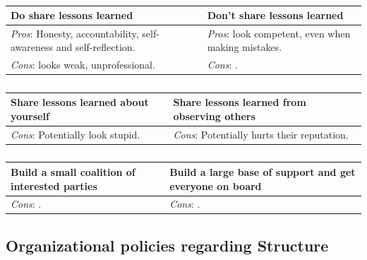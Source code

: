 \begin{center}
\begin{table}[ht]
\begin{tabular}{ | m{\dilemmatablewidth}| m{\dilemmatablewidth} | } 
  \hline
  \textbf{Do share lessons learned} & 
  \textbf{Don't share lessons learned} \\ 
  \hline
  \textit{Pros}: Honesty, accountability, self-awareness and self-reflection. & 
  \textit{Pros}: look competent, even when making mistakes. \\  
  \hline
  \textit{Cons}: looks weak, unprofessional. & 
  \textit{Cons}: . \\  
  \hline
\end{tabular}
\caption{
}
\label{table:sharing_lessons_learned}
\end{table}
\end{center}

\begin{center}
\begin{table}[ht]
\begin{tabular}{ | m{\dilemmatablewidth}| m{\dilemmatablewidth} | } 
  \hline
  \textbf{Share lessons learned about yourself} & 
  \textbf{Share lessons learned from observing others  } \\ 
  \hline
  \textit{Cons}: Potentially look stupid. & 
  \textit{Cons}: Potentially hurts their reputation. \\  
  \hline
\end{tabular}
\caption{
}
\label{table:share_lessons_learned}
\end{table}
\end{center}


\begin{center}
\begin{table}[ht]
\begin{tabular}{ | m{\dilemmatablewidth}| m{\dilemmatablewidth} | } 
  \hline
  \textbf{Build a small coalition of interested parties} & 
  \textbf{Build a large base of support and get everyone on board} \\ 
  \hline
  \textit{Cons}: . & 
  \textit{Cons}: . \\  
  \hline
\end{tabular}
\caption{
}
\label{table:how_to_change}
\end{table}
\end{center}

\subsection{Organizational policies regarding Structure}

